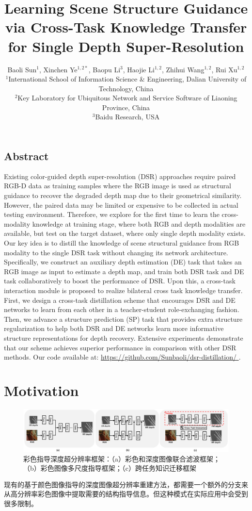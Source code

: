 \documentclass{vip-theme}
\title{Learning Scene Structure Guidance via Cross-Task Knowledge Transfer for Single Depth Super-Resolution}
\author{Baoli Sun$^1$, Xinchen Ye$^{1,2*}$, Baopu Li$^3$, Haojie Li$^{1,2}$, Zhihui Wang$^{1,2}$, Rui Xu$^{1,2}$ \\[0.1em]
	$^{1}$International School of Information Science \& Engineering, Dalian University of Technology, China  \\[0.1em]
	$^{2}$Key Laboratory for Ubiquitous Network and Service Software of Liaoning Province, China \\[0.1em]
	$^3$Baidu Research, USA
}
\begin{document}
\begin{sloppypar}
\maketitle
\label{title}

\vspace{0.2em}
\subsection*{Abstract} 
\label{abstract}
Existing color-guided depth super-resolution (DSR) approaches require paired RGB-D data as training samples where the RGB image is used as structural guidance to recover the degraded depth map due to their geometrical similarity. However, the paired data may be limited or expensive to be collected in actual testing environment. Therefore, we explore for the first time to learn the cross-modality knowledge at training stage, where both RGB and depth modalities are available, but test on the target dataset, where only single depth modality exists. Our key idea is to distill the knowledge of scene structural guidance from RGB modality to the single DSR task without changing its network architecture. Specifically, we construct an auxiliary depth estimation (DE) task that takes an RGB image as input to estimate a depth map, and train both DSR task and DE task collaboratively to boost the performance of DSR. Upon this, a cross-task interaction module is proposed to realize bilateral cross task knowledge transfer. First, we design a cross-task distillation scheme that encourages DSR and DE networks to learn from each other in a teacher-student role-exchanging fashion. Then, we advance a structure prediction (SP) task that provides extra structure regularization to help both DSR and DE networks learn more informative structure representations for depth recovery. Extensive experiments demonstrate that our scheme achieves superior performance in comparison with other DSR methods. Our code available at: \href{https://github.com/Sunbaoli/dsr-distillation/}{{\color{vipblue}https://github.com/Sunbaoli/dsr-distillation/}
}.

\section{Motivation}
\label{motivation}


\begin{figure}[!htbp]
	\centering
	\centerline{\includegraphics[width=0.97\linewidth]{figure/introduction2.png}}
	\caption{彩色指导深度超分辨率框架：（a）彩色和深度图像联合滤波框架；（b）彩色图像多尺度指导框架；（c）跨任务知识迁移框架}
	\label{fig:intro2}
\end{figure}
现有的基于颜色图像指导的深度图像超分辨率重建方法，都需要一个额外的分支来从高分辨率彩色图像中提取需要的结构指导信息。但这种模式在实际应用中会受到很多限制。


\end{sloppypar}
\end{document}
